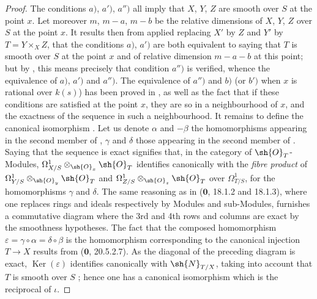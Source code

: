 \begin{proof}
The conditions $a)$, $a')$, $a'')$ all imply that $X$, $Y$, $Z$ are smooth over $S$ at the point $x$.
Let moreover $m$, $m-a$, $m-b$ be the relative dimensions of $X$, $Y$, $Z$ over $S$ at the point $x$.
It results then from  applied replacing $X'$ by $Z$ and $Y'$ by $T=Y\times_X Z$, that the conditions $a)$, $a')$ are both equivalent to saying that $T$ is smooth over $S$ at the point $x$ and of relative dimension $m-a-b$ at this point; but by , this means precisely that condition $a'')$ is verified, whence the equivalence of $a)$, $a')$ and $a'')$.
The equivalence of $a'')$ and $b)$ (or $b')$ when $x$ is rational over $k(s)$) has been proved in , as well as the fact that if these conditions are satisfied at the point $x$, they are so in a neighbourhood of $x$, and the exactness of the sequence  in such a neighbourhood.
It remains to define the canonical isomorphism .
Let us denote $\alpha$ and $-\beta$ the homomorphisms appearing in the second member of , $\gamma$ and $\delta$ those appearing in the second member of .
Saying that the sequence  is exact signifies that, in the category of $\sh{O}_T$-Modules, $\Omega^1_{X/S}\otimes_{\sh{O}_x}\sh{O}_T$ identifies canonically with the \emph{fibre product} of $\Omega^1_{Y/S}\otimes_{\sh{O}_y}\sh{O}_T$ and $\Omega^1_{Z/S}\otimes_{\sh{O}_z}\sh{O}_T$ over $\Omega^1_{T/S}$, for the homomorphisms $\gamma$ and $\delta$.
The same reasoning as in ($\mathbf{0}$, 18.1.2 and 18.1.3), where one replaces rings and ideals respectively by Modules and sub-Modules, furnishes a commutative diagram where the 3rd and 4th rows and columns are exact by the smoothness hypotheses.
The fact that the composed homomorphism $\varepsilon=\gamma\circ\alpha=\delta\circ\beta$ is the homomorphism corresponding to the canonical injection $T\to X$ results from ($\mathbf{0}$, 20.5.2.7).
As the diagonal of the preceding diagram is exact, $\operatorname{Ker}(\varepsilon)$ identifies canonically with $\sh{N}_{T/X}$, taking into account that $T$ is smooth over $S$ ; hence one has a canonical isomorphism  which is the reciprocal of $\iota$.
\end{proof}

